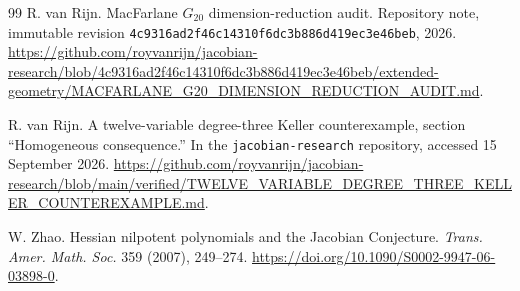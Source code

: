 \documentclass[11pt]{article}
\theoremstyle{remark}
\begin{document}
\begin{thebibliography}{99}
R. van Rijn.
\newblock MacFarlane $G_{20}$ dimension-reduction audit.
\newblock Repository note, immutable revision \texttt{4c9316ad2f46c14310f6dc3b886d419ec3e46beb}, 2026.
\newblock \url{https://github.com/royvanrijn/jacobian-research/blob/4c9316ad2f46c14310f6dc3b886d419ec3e46beb/extended-geometry/MACFARLANE_G20_DIMENSION_REDUCTION_AUDIT.md}.

R. van Rijn.
\newblock A twelve-variable degree-three Keller counterexample, section ``Homogeneous consequence.''
\newblock In the \texttt{jacobian-research} repository, accessed 15 September 2026.
\newblock \url{https://github.com/royvanrijn/jacobian-research/blob/main/verified/TWELVE_VARIABLE_DEGREE_THREE_KELLER_COUNTEREXAMPLE.md}.

W. Zhao.
\newblock Hessian nilpotent polynomials and the Jacobian Conjecture.
\newblock \emph{Trans. Amer. Math. Soc.} 359 (2007), 249--274.
\newblock \url{https://doi.org/10.1090/S0002-9947-06-03898-0}.

\end{thebibliography}
\end{document}
